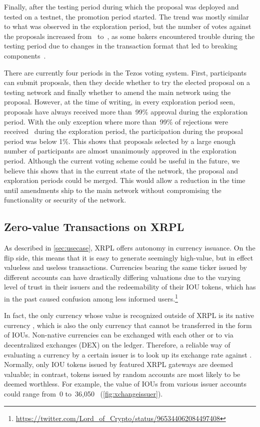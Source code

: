 Finally, after the testing period during which the proposal was deployed and tested on a testnet, the promotion period started.
The trend was mostly similar to what was observed in the exploration period, but the number of votes against the proposals increased from~ to~, as some bakers encountered trouble during the testing period due to changes in the transaction format that led to breaking components~\cite{ObsidianSys}.

There are currently four periods in the Tezos voting system. 
First, participants can submit proposals, then they decide whether to try the elected proposal on a testing network and finally whether to amend the main network using the proposal. 
However, at the time of writing, in every exploration period seen, proposals have always received more than~99\% approval during the exploration period.
With the only exception where more than~99\% of rejections were received~\cite{tezos-vote-reject} during the exploration period, the participation during the proposal period was below 1\%.
This shows that proposals selected by a large enough number of participants are almost unanimously approved in the exploration period.
Although the current voting scheme could be useful in the future, we believe this shows that in the current state of the network, the proposal and exploration periods could be merged.
This would allow a reduction in the time until amendments ship to the main network without compromising the functionality or security of the network.

\subsection{Zero-value Transactions on XRPL}
\label{sec:xrpcase}

As described in \autoref{sec:usecase}, XRPL offers autonomy in currency issuance. On the flip side, this means that it is easy to generate seemingly high-value, but in effect valueless and useless transactions. 
Currencies bearing the same ticker issued by different accounts can have drastically differing valuations due to the varying level of trust in their issuers and the redeemability of their IOU tokens, which has in the past caused confusion among less informed users.\footnote{\url{https://twitter.com/Lord_of_Crypto/status/965344062084497408}}

In fact, the only currency whose value is recognized outside of XRPL is its native currency , which is also the only currency that cannot be transferred in the form of IOUs. 
Non-native currencies can be exchanged with each other or to  via decentralized exchanges (DEX) on the ledger. 
Therefore, a reliable way of evaluating a currency by a certain issuer is to look up its exchange rate against . 
Normally, only IOU tokens issued by featured XRPL gateways are deemed valuable; in contrast, tokens issued by random accounts are most likely to be deemed worthless. 
For example, the value of  IOUs from various issuer accounts could range from~0 to~36,050~ (\autoref{fig:xchangeissuer}).

